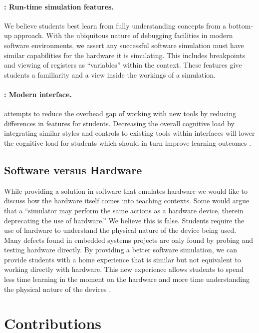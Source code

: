 \paragraph{: Run-time simulation features.} We believe students best learn from fully understanding concepts from a bottom-up approach. With the ubiquitous nature of debugging facilities in modern software environments, we assert any successful software simulation must have similar capabilities for the hardware it is simulating. This includes breakpoints and viewing of registers as ``variables'' within the context. These features give students a familiarity and a view inside the workings of a simulation.

\paragraph{: Modern interface.}  attempts to reduce the overhead gap of working with new tools by reducing differences in features for students. Decreasing the overall cognitive load by integrating similar styles and controls to existing tools within interfaces will lower the cognitive load for students which should in turn improve learning outcomes \cite{Chalmers2003, Mavaddat1988}.

\subsection{Software versus Hardware}

While providing a solution in software that emulates hardware we would like to discuss how the hardware itself comes into teaching contexts. Some would argue that a ``simulator may perform the same actions as a hardware device, therein deprecating the use of hardware.'' We believe this is false. Students require the use of hardware to understand the physical nature of the device being used. Many defects found in embedded systems projects are only found by probing and testing hardware directly. By providing a better software simulation, we can provide students with a home experience that is similar but not equivalent to working directly with hardware. This new experience allows students to spend less time learning in the moment on the hardware and more time understanding the physical nature of the devices \cite{Ristov2014, Skrien2001}.

\section{Contributions}

